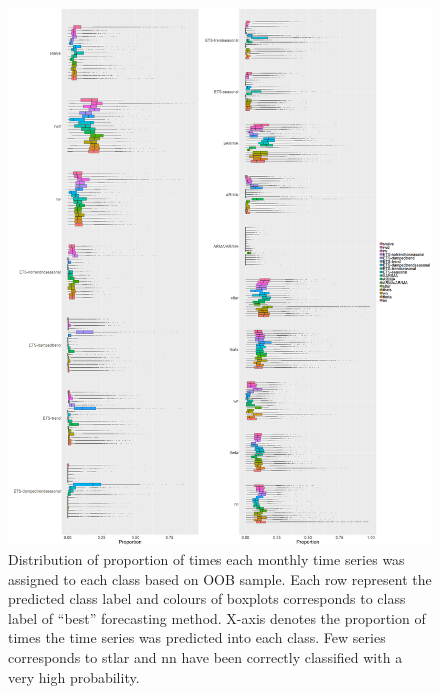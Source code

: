 \documentclass[11pt,a4paper,]{article}
\begin{document}
\begin{figure}
\centering
\includegraphics{figures/oobquarterlymonthly2-1.png}
\caption{\label{fig:oobquarterlymonthly2} Distribution of proportion of
times each monthly time series was assigned to each class based on OOB
sample. Each row represent the predicted class label and colours of
boxplots corresponds to class label of ``best'' forecasting method.
X-axis denotes the proportion of times the time series was predicted
into each class. Few series corresponds to stlar and nn have been
correctly classified with a very high probability.}
\end{figure}

\clearpage
\end{document}

